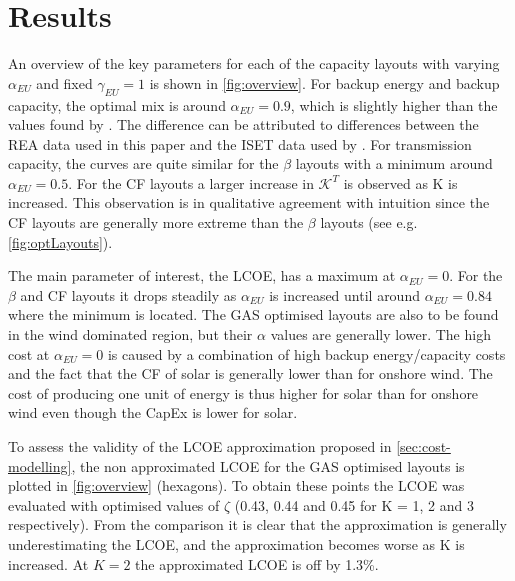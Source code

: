 \documentclass[a4paper, 5p, sort&compress]{elsarticle}%
\begin{document}

\section{Results}
\label{sec:results}

An overview of the key parameters for each of the capacity layouts
with varying $\alpha_{EU}$ and fixed $\gamma_{EU} = 1 $
is shown in \cref{fig:overview}. For
backup energy and backup capacity, the optimal mix is around
$\alpha_{EU} = 0.9$, which is slightly higher than the values found by
\cite{Heide2010,Heide2011}.
The difference can be attributed to differences between the REA data
used in this paper and the ISET data \cite{iset} used by
\cite{Heide2010,Heide2011}. For transmission capacity, the curves are
quite similar for the $\beta$ layouts with a minimum around
$\alpha_{EU} = 0.5$. For the CF layouts a larger increase in
$\mathcal{K}^{T}$ is observed as K is increased. This observation is
in qualitative agreement with intuition since the CF layouts are
generally more extreme than the $\beta$ layouts (see
e.g. \cref{fig:optLayouts}).


The main parameter of interest, the LCOE, has a maximum at
$\alpha_{EU} = 0$. For the $\beta$ and CF layouts it drops steadily as
$\alpha_{EU}$ is increased until around $\alpha_{EU} = 0.84$ where the minimum
is located. The GAS optimised layouts are also to be found in the wind
dominated region, but their $\alpha$ values are generally lower. The high
cost at $\alpha_{EU} = 0$ is caused by a combination of high backup
energy/capacity costs and the fact that the CF of solar is generally
lower than for onshore wind. The cost of producing one unit of energy
is thus higher for solar than for onshore wind even though the
\gls{CapEx} is lower for solar.

To assess the validity of the LCOE approximation proposed in
\cref{sec:cost-modelling}, the non approximated LCOE for the GAS
optimised layouts is plotted in \cref{fig:overview} (hexagons). To
obtain these points the LCOE was evaluated with optimised values of
$\zeta$ (0.43, 0.44 and 0.45 for K = 1, 2 and 3 respectively). From the
comparison it is clear that the approximation is generally
underestimating the LCOE, and the approximation becomes worse as K is
increased. At $K=2$ the approximated LCOE is off by 1.3\%.
\end{document}
